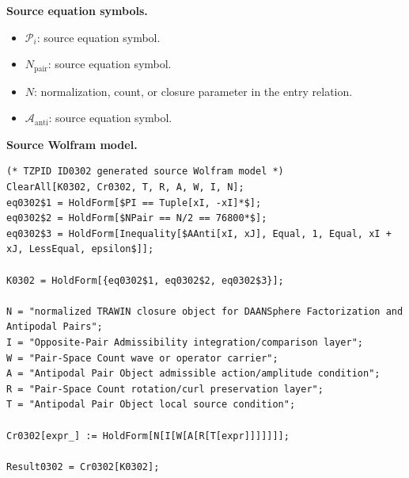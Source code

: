 \begin{minipage}[t]{0.49\linewidth}
\begingroup
\small
\raggedright
\textbf{Source equation symbols.}\par
\begin{itemize}[leftmargin=1.35em,itemsep=1pt,topsep=1pt,parsep=0pt]
    \item $\mathcal{P}_i$: source equation symbol.
    \item $N_{\mathrm{pair}}$: source equation symbol.
    \item $N$: normalization, count, or closure parameter in the entry relation.
    \item $\mathcal{A}_{\mathrm{anti}}$: source equation symbol.
\end{itemize}
\endgroup
\end{minipage}\hfill
\begin{minipage}[t]{0.47\linewidth}
\begingroup
\scriptsize
\raggedright
\textbf{Source Wolfram model.}\par
\begin{Verbatim}[fontsize=\tiny,breaklines=true,breakanywhere=true]
(* TZPID ID0302 generated source Wolfram model *)
ClearAll[K0302, Cr0302, T, R, A, W, I, N];
eq0302$1 = HoldForm[$PI == Tuple[xI, -xI]*$];
eq0302$2 = HoldForm[$NPair == N/2 == 76800*$];
eq0302$3 = HoldForm[Inequality[$AAnti[xI, xJ], Equal, 1, Equal, xI + xJ, LessEqual, epsilon$]];

K0302 = HoldForm[{eq0302$1, eq0302$2, eq0302$3}];

N = "normalized TRAWIN closure object for DAANSphere Factorization and Antipodal Pairs";
I = "Opposite-Pair Admissibility integration/comparison layer";
W = "Pair-Space Count wave or operator carrier";
A = "Antipodal Pair Object admissible action/amplitude condition";
R = "Pair-Space Count rotation/curl preservation layer";
T = "Antipodal Pair Object local source condition";

Cr0302[expr_] := HoldForm[N[I[W[A[R[T[expr]]]]]]];

Result0302 = Cr0302[K0302];
\end{Verbatim}
\endgroup
\end{minipage}

